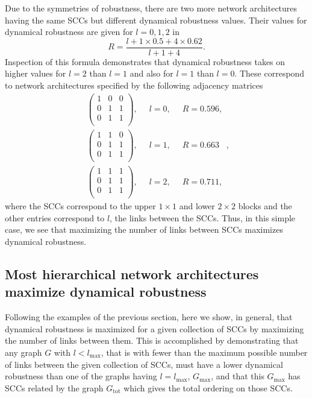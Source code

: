 Due to the symmetries of robustness, there are two more network architectures having the same SCCs but different dynamical robustness values. Their values for dynamical robustness are given for $l=0,1,2$ in
$$
R = \frac{l+1 \times 0.5 + 4 \times 0.62}{l+1+4}.
$$
Inspection of this formula demonstrates that dynamical robustness takes on higher values for $l=2$ than $l=1$ and also for $l=1$ than $l=0$. These correspond to network architectures specified by the following adjacency matrices
\begin{equation}
\begin{aligned}
\begin{pmatrix}
1 & 0 & 0\\
0 & 1 & 1\\
0 & 1 & 1\\
\end{pmatrix}, & \;\; l = 0, \;\; & R = 0.596,\\
\begin{pmatrix}
1 & 1 & 0\\
0 & 1 & 1\\
0 & 1 & 1\\
\end{pmatrix}, & \;\; l = 1, \;\; & R = 0.663\\
\begin{pmatrix}
1 & 1 & 1\\
0 & 1 & 1\\
0 & 1 & 1\\
\end{pmatrix}, & \;\; l = 2, \;\; & R = 0.711,
\end{aligned},
\end{equation}
where the SCCs correspond to the upper $1 \times 1$ and lower $2 \times 2$ blocks and the other entries correspond to $l$, the links between the SCCs. Thus, in this simple case, we see that maximizing the number of links between SCCs maximizes dynamical robustness.

\subsection{Most hierarchical network architectures maximize dynamical robustness}
Following the examples of the previous section, here we show, in general, that dynamical robustness is maximized for a given collection of SCCs by maximizing the number of links between them. This is accomplished by demonstrating that any graph $G$ with $l < l_{\mathrm{max}}$, that is with fewer than the maximum possible number of links between the given collection of SCCs, must have a lower dynamical robustness than one of the graphs having $l=l_{\mathrm{max}}$, $G_{\mathrm{max}}$, and that this $G_{\mathrm{max}}$ has SCCs related by the graph $G_{\mathrm{tot}}$ which gives the total ordering on those SCCs.

